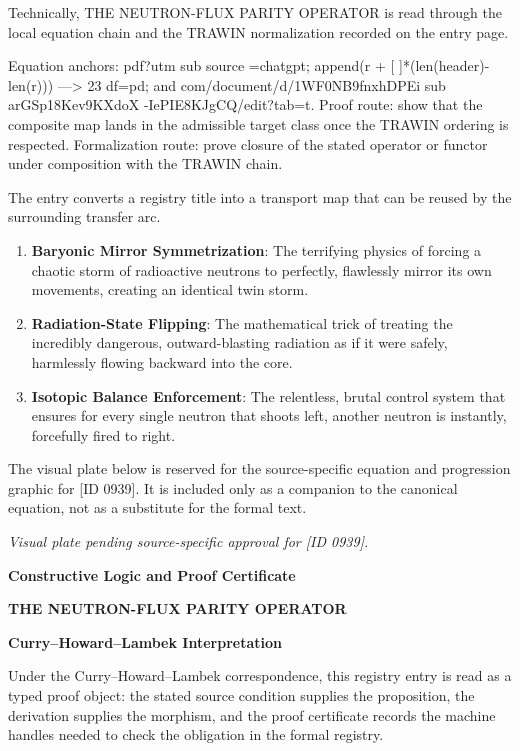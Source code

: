 Technically, THE NEUTRON-FLUX PARITY OPERATOR is read through the local equation chain and the TRAWIN normalization recorded on the entry page.

Equation anchors: pdf?utm sub source =chatgpt; append(r + [ ]*(len(header)-len(r))) ---> 23 df=pd; and com/document/d/1WF0NB9fnxhDPEi sub arGSp18Kev9KXdoX -IePIE8KJgCQ/edit?tab=t. Proof route: show that the composite map lands in the admissible target class once the TRAWIN ordering is respected. Formalization route: prove closure of the stated operator or functor under composition with the TRAWIN chain.

The entry converts a registry title into a transport map that can be reused by the surrounding transfer arc.
\endgroup

\begin{enumerate}[leftmargin=1.6em,itemsep=6pt,topsep=4pt]
\item \textbf{Baryonic Mirror Symmetrization}: The terrifying physics of forcing a chaotic storm of radioactive neutrons to perfectly, flawlessly mirror its own movements, creating an identical twin storm.
\item \textbf{Radiation-State Flipping}: The mathematical trick of treating the incredibly dangerous, outward-blasting radiation as if it were safely, harmlessly flowing backward into the core.
\item \textbf{Isotopic Balance Enforcement}: The relentless, brutal control system that ensures for every single neutron that shoots left, another neutron is instantly, forcefully fired to right.
\end{enumerate}

\begingroup\footnotesize\sloppy
The visual plate below is reserved for the source-specific equation and progression graphic for [ID 0939]. It is included only as a companion to the canonical equation, not as a substitute for the formal text.
\par\endgroup
\begingroup\footnotesize\itshape
Visual plate pending source-specific approval for [ID 0939].
\par\endgroup

\clearpage
\begingroup\tzpsupportsetup
\noindent\textbf{\fontsize{10.8pt}{12.8pt}\selectfont [ID 0939] Constructive Logic and Proof Certificate}\par
\noindent\textbf{\fontsize{10pt}{12pt}\selectfont THE NEUTRON-FLUX PARITY OPERATOR}\par
\vspace{0.45em}
\begingroup
\footnotesize
\setlength{\parskip}{0.22em}
\setlength{\parindent}{0pt}
\noindent\textbf{Curry--Howard--Lambek Interpretation}\par
Under the Curry--Howard--Lambek correspondence, this registry entry is read as a typed proof
object: the stated source condition supplies the proposition, the derivation supplies the
morphism, and the proof certificate records the machine handles needed to check the obligation
in the formal registry.

